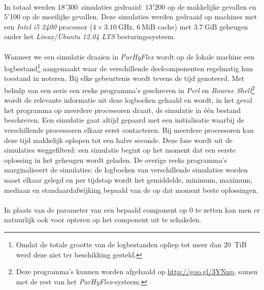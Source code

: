 \paragraph{}
In totaal werden $18'300$~simulaties gedraaid: $13'200$ op de makkelijke gevallen en 5'100 op de moeilijke gevallen. Deze simulaties werden gedraaid op machines met een \emph{Intel i5 2400} processor ($4\times3.10~\mbox{GHz}$, $6~\mbox{MiB}$ cache) met $3.7~\mbox{GiB}$ geheugen onder het \emph{Linux/Ubuntu 12.04 LTS} besturingssysteem.

\paragraph{}
Wanneer we een simulatie draaien in \emph{ParHyFlex} wordt op de lokale machine een logbestand\footnote{Omdat de totale grootte van de logbestanden opliep tot meer dan 20~\mbox{TiB} werd deze niet ter beschikking gesteld.} aangemaakt waar de verschillende deelcomponenten regelmatig hun toestand in noteren. Bij elke gebeurtenis wordt tevens de tijd genoteerd. Met behulp van een serie een reeks programma's geschreven in \emph{Perl} en \emph{Bourne Shell}\footnote{Deze programma's kunnen worden afgehaald op \url{http://goo.gl/3YNnp}, samen met de rest van het \emph{ParHyFlex}-systeem.} wordt de relevante informatie uit deze logboeken gehaald en wordt, in het geval het programma op meerdere processoren draait, de simulatie in \'e\'en bestand beschreven. Een simulatie gaat altijd gepaard met een initialisatie waarbij de verschillende processoren elkaar eerst contacteren. Bij meerdere processoren kan deze tijd makkelijk oplopen tot een halve seconde. Deze fase wordt uit de simulaties weggefilterd: een simulatie begint op het moment dat een eerste oplossing in het geheugen wordt geladen. De overige reeks programma's marginaliseert de simulaties: de logboeken van verschillende simulaties worden naast elkaar gelegd en per tijdstap wordt het gemiddelde, minimum, maximum, mediaan en standaardafwijking bepaald van de op dat moment beste oplossingen.

\paragraph{}
In plaats van de parameter van een bepaald component op 0 te zetten kan men er natuurlijk ook voor opteren op het component uit te schakelen.

